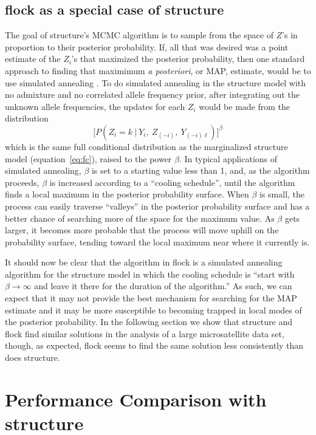 \subsection*{{\sc flock} as a special case of {\sc structure}}
The goal of {\sc structure}'s MCMC algorithm is to sample from the space of 
$Z$'s in proportion to their posterior probability.  If, all that was desired
was a point estimate of the $Z_i$'s that maximized the posterior probability,
then one standard approach to finding that maximimum {\em a posteriori}, or MAP, 
estimate, would be to use simulated annealing \citep{Kirkpatricketal1983}.
To do simulated annealing in the {\sc structure} model with no admixture and
no correlated allele frequency prior, after integrating out the unknown
allele frequencies, the updates for each $Z_i$ would be made from the 
distribution
\[
\biggl[P(Z_i=k~|~Y_i, ~Z_{(-i)},~Y_{(-i)\ell})\biggr]^\beta
\]
which is the same full conditional distribution as the marginalized {\sc structure}
model (equation~\ref{eq:fc}), raised
to the power $\beta$.  In typical applications of simulated annealing,
$\beta$ is set to a starting value less than 1, and, as the algorithm proceeds,
$\beta$ is increased according to a ``cooling schedule''\citep{Hajek1988}, until
the algorithm finds a local maximum in the posterior probability surface.  
When $\beta$ is small, the process can easily traverse ``valleys''
in the posterior probability surface and has a better chance of searching
more of the space for the maximum value.  As $\beta$ gets larger, it becomes
more probable that the process will
move uphill on the probability surface, tending toward the local
maximum near where it currently is.    

It should now be clear that the algorithm in {\sc flock} is a simulated annealing 
algorithm for the {\sc structure} model in which the cooling schedule is
``start with $\beta\rightarrow\infty$ and leave it there for the duration of 
the algorithm.''  As such, we can expect that it may not provide the best 
mechanism for searching for the MAP estimate and it may be more susceptible 
to becoming trapped in local modes of the posterior probability. 
In the following section we show that {\sc structure} and {\sc flock} find similar
solutions in the analysis of a large microsatellite data set, though, as expected,
{\sc flock} seems to find the same solution less consistently than does {\sc structure}.





\section*{Performance Comparison with {\sc structure}}

